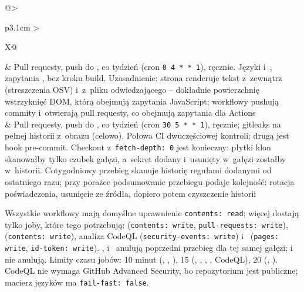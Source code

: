 \begin{xltabular}{\linewidth}{@{}>{\raggedright\arraybackslash}p{3.1cm} >{\raggedright\arraybackslash}X@{}}
 & Pull requesty, push do , co tydzień (cron \texttt{0 4 * * 1}), ręcznie. Języki  i~, zapytania , bez kroku build. Uzasadnienie: strona renderuje tekst z~zewnątrz (streszczenia OSV) i~z~pliku odwiedzającego -- dokładnie powierzchnię wstrzyknięć DOM, którą obejmują zapytania JavaScript; workflowy pushują commity i~otwierają pull requesty, co obejmują zapytania dla Actions \\
 & Pull requesty, push do , co tydzień (cron \texttt{30 5 * * 1}), ręcznie; gitleaks na pełnej historii z~obrazu  (celowo). Połowa CI dwuczęściowej kontroli; drugą jest hook pre-commit. Checkout z~\texttt{fetch-depth: 0} jest konieczny: płytki klon skanowałby tylko czubek gałęzi, a~sekret dodany i~usunięty w~gałęzi zostałby w~historii. Cotygodniowy przebieg skanuje historię regułami dodanymi od ostatniego razu; przy porażce podsumowanie przebiegu podaje kolejność: rotacja poświadczenia, usunięcie ze źródła, dopiero potem czyszczenie historii \\
\bottomrule
\end{xltabular}

Wszystkie workflowy mają domyślne uprawnienie \texttt{contents: read}; więcej dostają tylko
joby, które tego potrzebują:  (\texttt{contents: write},
\texttt{pull-requests: write}),  (\texttt{contents: write}), analiza
CodeQL (\texttt{security-events: write}) i~ (\texttt{pages: write},
\texttt{id-token: write}). ,  i~
anulują poprzedni przebieg dla tej samej gałęzi;  i~
nie anulują. Limity czasu jobów: 10 minut (, ,
), 15 (, , ,
, CodeQL), 20 (, ). CodeQL nie wymaga
GitHub Advanced Security, bo repozytorium jest publiczne; macierz języków ma
\texttt{fail-fast: false}.

